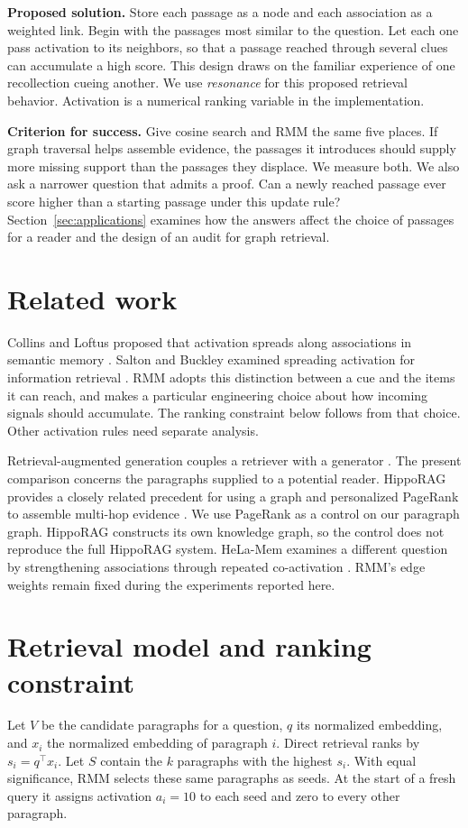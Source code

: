 \documentclass[11pt,a4paper]{article}
\begin{document}
\textbf{Proposed solution.} Store each passage as a node and each association as a weighted link. Begin with the passages most similar to the question. Let each one pass activation to its neighbors, so that a passage reached through several clues can accumulate a high score. This design draws on the familiar experience of one recollection cueing another. We use \emph{resonance} for this proposed retrieval behavior. Activation is a numerical ranking variable in the implementation.

\textbf{Criterion for success.} Give cosine search and RMM the same five places. If graph traversal helps assemble evidence, the passages it introduces should supply more missing support than the passages they displace. We measure both. We also ask a narrower question that admits a proof. Can a newly reached passage ever score higher than a starting passage under this update rule? Section~\ref{sec:applications} examines how the answers affect the choice of passages for a reader and the design of an audit for graph retrieval.

\newpage
\section{Related work}
Collins and Loftus proposed that activation spreads along associations in semantic memory \cite{collins}. Salton and Buckley examined spreading activation for information retrieval \cite{salton}. RMM adopts this distinction between a cue and the items it can reach, and makes a particular engineering choice about how incoming signals should accumulate. The ranking constraint below follows from that choice. Other activation rules need separate analysis.

Retrieval-augmented generation couples a retriever with a generator \cite{rag}. The present comparison concerns the paragraphs supplied to a potential reader. HippoRAG provides a closely related precedent for using a graph and personalized PageRank to assemble multi-hop evidence \cite{hippo}. We use PageRank as a control on our paragraph graph. HippoRAG constructs its own knowledge graph, so the control does not reproduce the full HippoRAG system. HeLa-Mem examines a different question by strengthening associations through repeated co-activation \cite{hela}. RMM's edge weights remain fixed during the experiments reported here.

\section{Retrieval model and ranking constraint}
Let $V$ be the candidate paragraphs for a question, $q$ its normalized embedding, and $x_i$ the normalized embedding of paragraph $i$. Direct retrieval ranks by $s_i=q^\top x_i$. Let $S$ contain the $k$ paragraphs with the highest $s_i$. With equal significance, RMM selects these same paragraphs as seeds. At the start of a fresh query it assigns activation $a_i=10$ to each seed and zero to every other paragraph.
\end{document}
